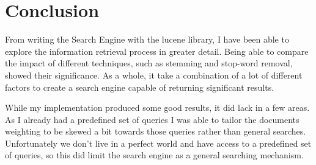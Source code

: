 \section{Conclusion}
From writing the Search Engine with the lucene library, I have been able to explore the information retrieval process in greater detail. Being able to compare the impact of different techniques, such as stemming and stop-word removal, showed their significance. As a whole, it take a combination of a lot of different factors to create a search engine capable of returning significant results. \par
While my implementation produced some good results, it did lack in a few areas. As I already had a predefined set of queries I was able to tailor the documents weighting to be skewed a bit towards those queries rather than general searches. Unfortunately we don't live in a perfect world and have access to a predefined set of queries, so this did limit the search engine as a general searching mechanism. 
  
